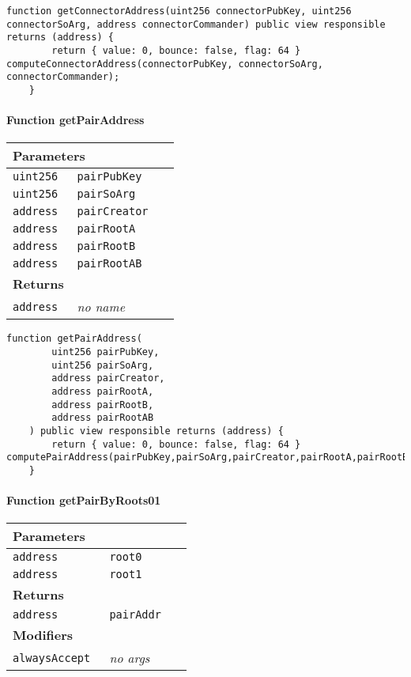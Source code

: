 \vspace{2cm}

\begin{lstlisting}[firstnumber=233]
	function getConnectorAddress(uint256 connectorPubKey, uint256 connectorSoArg, address connectorCommander) public view responsible returns (address) {
		return { value: 0, bounce: false, flag: 64 } computeConnectorAddress(connectorPubKey, connectorSoArg, connectorCommander);
	}
\end{lstlisting}

\paragraph{Function getPairAddress}


\ifsoltables
\noindent\begin{tabular}{|l|l|p{5cm}|}\hline
\multicolumn{3}{|l|}{\bf Parameters}\\\hline
\tt uint256 & \tt pairPubKey &\\\hline
\tt uint256 & \tt pairSoArg &\\\hline
\tt address & \tt pairCreator &\\\hline
\tt address & \tt pairRootA &\\\hline
\tt address & \tt pairRootB &\\\hline
\tt address & \tt pairRootAB &\\\hline
\multicolumn{3}{|l|}{\bf Returns}\\\hline
\tt address & {\em no name} &\\\hline
\end{tabular}
\fi

\vspace{2cm}

\begin{lstlisting}[firstnumber=171]
	function getPairAddress(
		uint256 pairPubKey,
		uint256 pairSoArg,
		address pairCreator,
		address pairRootA,
		address pairRootB,
		address pairRootAB
	) public view responsible returns (address) {
		return { value: 0, bounce: false, flag: 64 } computePairAddress(pairPubKey,pairSoArg,pairCreator,pairRootA,pairRootB,pairRootAB);
	}
\end{lstlisting}

\paragraph{Function getPairByRoots01}


\ifsoltables
\noindent\begin{tabular}{|l|l|p{5cm}|}\hline
\multicolumn{3}{|l|}{\bf Parameters}\\\hline
\tt address & \tt root0 &\\\hline
\tt address & \tt root1 &\\\hline
\multicolumn{3}{|l|}{\bf Returns}\\\hline
\tt address & \tt pairAddr &\\\hline
\multicolumn{3}{|l|}{\bf Modifiers}\\\hline
\tt alwaysAccept & {\em no args} &\\\hline
\end{tabular}
\fi

